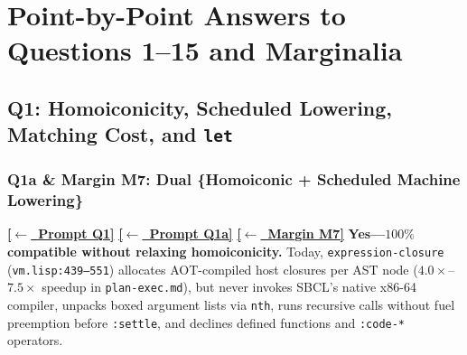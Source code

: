\documentclass[12pt]{article}
\newcommand{\ansback}[2]{\hyperlink{#1}{\textcolor{qpurple}{\textbf{\small[\(\leftarrow\)~#2]}}}}
\begin{document}
\section{Point-by-Point Answers to Questions 1--15 and Marginalia}
\label{sec:qa}

\subsection{Q1: Homoiconicity, Scheduled Lowering, Matching Cost, and \texttt{let}}
\label{ans:1}

\subsubsection{Q1a \& Margin M7: Dual \{Homoiconic + Scheduled Machine Lowering\}}
\label{ans:1a}

\ansback{q:1}{Prompt Q1} \ansback{q:1a}{Prompt Q1a} \ansback{q:m7}{Margin M7}
\textbf{Yes---$100\%$ compatible without relaxing homoiconicity.} Today, \texttt{expression-closure} (\texttt{vm.lisp:439--551}) allocates AOT-compiled host closures per AST node ($4.0\times$--$7.5\times$ speedup in \texttt{plan-exec.md}), but never invokes SBCL's native x86-64 compiler, unpacks boxed argument lists via \texttt{nth}, runs recursive calls without fuel preemption before \texttt{:settle}, and declines defined functions and \texttt{:code-*} operators.
\end{document}
